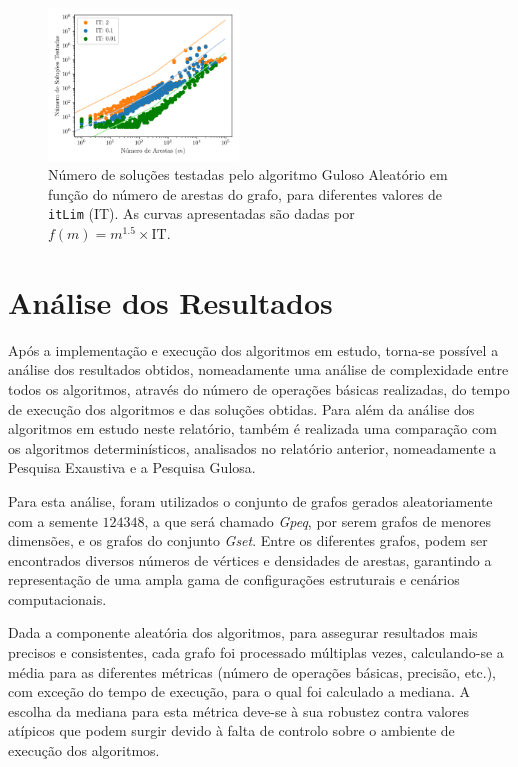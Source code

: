 \documentclass[mirror, portugues]{revdetua}
\begin{document}
\begin{figure}[H]
    \centering
    \includegraphics[width=0.45\textwidth]{../assets/sols_Random Greedy.png}
    \caption{Número de soluções testadas pelo algoritmo Guloso Aleatório em função do número de arestas do grafo, para diferentes valores de \texttt{itLim} (IT). As curvas apresentadas são dadas por $f(m) = m^{1.5} \times \text{IT}$.}
    \label{fig:sols_randomgreedy}
\end{figure}

\section{Análise dos Resultados}

Após a implementação e execução dos algoritmos em estudo, torna-se possível a análise dos resultados obtidos, nomeadamente uma análise de complexidade entre todos os algoritmos, através do número de operações básicas realizadas, do tempo de execução dos algoritmos e das soluções obtidas. Para além da análise dos algoritmos em estudo neste relatório, também é realizada uma comparação com os algoritmos determinísticos, analisados no relatório anterior, nomeadamente a Pesquisa Exaustiva e a Pesquisa Gulosa.

Para esta análise, foram utilizados o conjunto de grafos gerados aleatoriamente com a semente $124348$, a que será chamado \textit{Gpeq}, por serem grafos de menores dimensões, e os grafos do conjunto \textit{Gset}. Entre os diferentes grafos, podem ser encontrados diversos números de vértices e densidades de arestas, garantindo a representação de uma ampla gama de configurações estruturais e cenários computacionais.

Dada a componente aleatória dos algoritmos, para assegurar resultados mais precisos e consistentes, cada grafo foi processado múltiplas vezes, calculando-se a média para as diferentes métricas (número de operações básicas, precisão, etc.), com exceção do tempo de execução, para o qual foi calculado a mediana. A escolha da mediana para esta métrica deve-se à sua robustez contra valores atípicos que podem surgir devido à falta de controlo sobre o ambiente de execução dos algoritmos.
\end{document}
